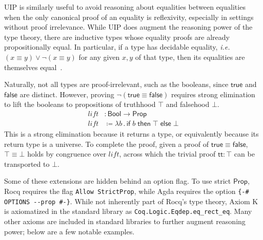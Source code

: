 \documentclass{article}
\makeatletter
\newcommand{\ie}{\textit{i.e.}\@\xspace}
\newcommand{\kw}[1]{\mathsf{#1}}
\newcommand{\code}[1]{\texttt{#1}}
\makeatother
\begin{document}
UIP is similarly useful to avoid reasoning about equalities between equalities
when the only canonical proof of an equality is reflexivity,
especially in settings without proof irrelevance.
While UIP does augment the reasoning power of the type theory,
there are inductive types whose equality proofs are already propositionally equal.
In particular, if a type has decidable equality,
\ie $(x \equiv y) \vee \neg (x \equiv y)$ for any given $x, y$ of that type,
then its equalities are themselves equal~\citep{hedberg}.

Naturally, not all types are proof-irrelevant,
such as the booleans, since $\kw{true}$ and $\kw{false}$ are distinct.
However, proving $\neg (\kw{true} \equiv \kw{false})$ requires strong elimination
to lift the booleans to propositions of truthhood $\top$ and falsehood $\bot$.
%
\begin{align*}
  \mathit{lift} &: \kw{Bool} \to \kw{Prop} \\
  \mathit{lift} &\coloneqq \lambda b \mathpunct{.} \kw{if} \; b \; \kw{then} \; \top \; \kw{else} \; \bot
\end{align*}
%
This is a strong elimination because it returns a type,
or equivalently because its return type is a universe.
To complete the proof,
given a proof of $\kw{true} \equiv \kw{false}$,
$\top \equiv \bot$ holds by congruence over $\mathit{lift}$,
across which the trivial proof $\kw{tt} : \top$ can be transported to $\bot$.

Some of these extensions are hidden behind an option flag.
To use strict $\kw{Prop}$,
Rocq requires the flag \code{Allow StrictProp},
while Agda requires the option \code{\{-\# OPTIONS -{}-prop \#-\}}.
While not inherently part of Rocq's type theory,
Axiom K is axiomatized in the standard library as \code{Coq.Logic.Eqdep.eq\_rect\_eq}.
Many other axioms are included in standard libraries
to further augment reasoning power;
below are a few notable examples.
\end{document}
